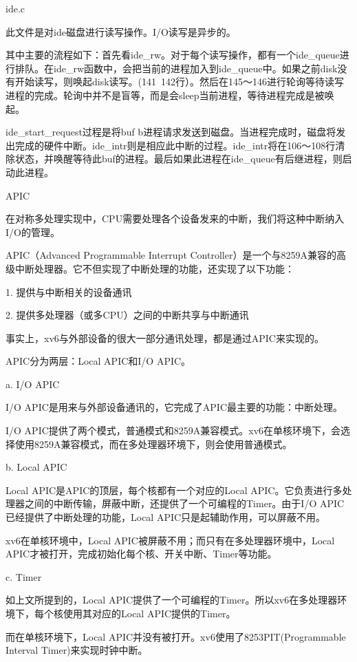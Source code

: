 ide.c

此文件是对ide磁盘进行读写操作。I/O读写是异步的。

其中主要的流程如下：首先看ide\_rw。对于每个读写操作，都有一个ide\_queue进行排队。在ide\_rw函数中，会把当前的进程加入到ide\_queue中。如果之前disk没有开始读写，则唤起disk读写。(141~142行）。然后在145～146进行轮询等待读写进程的完成。轮询中并不是盲等，而是会sleep当前进程，等待进程完成是被唤起。

  ide\_start\_request过程是将buf b进程请求发送到磁盘。当进程完成时，磁盘将发出完成的硬件中断。ide\_intr则是相应此中断的过程。ide\_intr将在106～108行清除状态，并唤醒等待此buf的进程。最后如果此进程在ide\_queue有后继进程，则启动此进程。

  APIC

  在对称多处理实现中，CPU需要处理各个设备发来的中断，我们将这种中断纳入I/O的管理。

  APIC（Advanced Programmable Interrupt Controller）是一个与8259A兼容的高级中断处理器。它不但实现了中断处理的功能，还实现了以下功能：

  1. 提供与中断相关的设备通讯

2. 提供多处理器（或多CPU）之间的中断共享与中断通讯

事实上，xv6与外部设备的很大一部分通讯处理，都是通过APIC来实现的。

APIC分为两层：Local APIC和I/O APIC。

a. I/O APIC

I/O APIC是用来与外部设备通讯的，它完成了APIC最主要的功能：中断处理。

I/O APIC提供了两个模式，普通模式和8259A兼容模式。xv6在单核环境下，会选择使用8259A兼容模式，而在多处理器环境下，则会使用普通模式。

b. Local APIC

Local APIC是APIC的顶层，每个核都有一个对应的Local APIC。它负责进行多处理器之间的中断传输，屏蔽中断，还提供了一个可编程的Timer。由于I/O APIC已经提供了中断处理的功能，Local APIC只是起辅助作用，可以屏蔽不用。

xv6在单核环境中，Local APIC被屏蔽不用；而只有在多处理器环境中，Local APIC才被打开，完成初始化每个核、开关中断、Timer等功能。

c. Timer

如上文所提到的，Local APIC提供了一个可编程的Timer。所以xv6在多处理器环境下，每个核使用其对应的Local APIC提供的Timer。

而在单核环境下，Local APIC并没有被打开。xv6使用了8253PIT(Programmable Interval Timer)来实现时钟中断。
